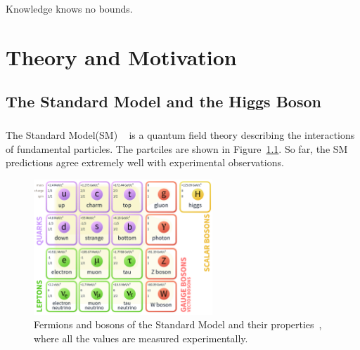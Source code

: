 \begin{savequote}[75mm]
Knowledge knows no bounds.
\end{savequote}

\chapter{Theory and Motivation}

\section{The Standard Model and the Higgs Boson}
\paragraph{}
The Standard Model(SM) ~\cite{Pdg,Griffiths,Tully,Schwartz} is a quantum field theory describing the interactions of fundamental particles. The partciles are shown in Figure~\ref{fig:SM}. So far, the SM predictions agree extremely well with experimental observations.

\begin{figure}[h!]
  \centering
  \captionsetup{justification=centering}
  \includegraphics[width=0.6\textwidth]{figures/theory/SM}
  \caption{Fermions and bosons of the Standard Model and their properties~\cite{Pdg}, where all the values are measured experimentally.}
  \label{fig:SM}
\end{figure}

